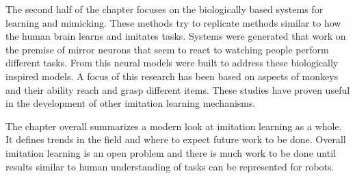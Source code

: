 \documentclass[10pt]{article}
\begin{document}
The second half of the chapter focuses on the biologically based systems for learning and mimicking. These methods try to replicate methods similar to how the human brain learns and imitates tasks. Systems were generated that work on the premise of mirror neurons that seem to react to watching people perform different tasks. From this neural models were built to address these biologically inspired models. A focus of this research has been based on aspects of monkeys and their ability reach and grasp different items. These studies have proven useful in the development of other imitation learning mechanisms.

The chapter overall summarizes a modern look at imitation learning as a whole. It defines trends in the field and where to expect future work to be done. Overall imitation learning is an open problem and there is much work to be done until results similar to human understanding of tasks can be represented for robots.


\cite{citation}
\end{document}
